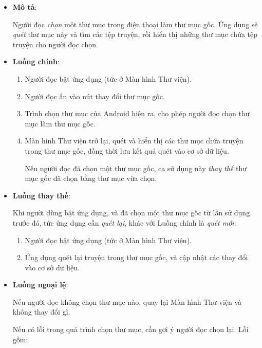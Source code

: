 \documentclass[../../thesis]{subfiles}
\begin{document}
\begin{itemize}
    \item
        \textbf{Mô tả}:

        Người đọc \emph{chọn} một thư mục trong điện thoại làm thư mục gốc. Ứng
        dụng sẽ \emph{quét} thư mục này và tìm các tệp truyện, rồi hiển thị
        những thư mục chứa tệp truyện cho người đọc chọn.
    \item
        \textbf{Luồng chính}:

        \begin{enumerate}
            \item
                Người đọc bật ứng dụng (tức ở Màn hình Thư viện).
            \item
                Người đọc ấn vào nút thay đổi thư mục gốc.
            \item
                Trình chọn thư mục của Android hiện ra, cho phép người đọc chọn
                thư mục làm thư mục gốc.
            \item
                Màn hình Thư viện trở lại, quét và hiển thị các thư mục chứa
                truyện trong thư mục gốc, đồng thời lưu kết quả quét vào cơ sở
                dữ liệu.

                Nếu người đọc đã chọn một thư mục gốc, ca sử dụng này \emph{thay
                thế} thư mục gốc đã chọn bằng thư mục vừa chọn.
        \end{enumerate}
    \item
        \textbf{Luồng thay thế}:

        Khi người dùng bật ứng dụng, và đã chọn một thư mục gốc từ lần sử dụng
        trước đó, tức ứng dụng cần \emph{quét lại}, khác với Luồng chính là
        \emph{quét mới}:

        \begin{enumerate}
            \item
                Người đọc bật ứng dụng (tức ở Màn hình Thư viện).
            \item
                Ứng dụng quét lại truyện trong thư mục gốc, và cập nhật các thay
                đổi vào cơ sở dữ liệu.
        \end{enumerate}
    \item
        \textbf{Luồng ngoại lệ}:

        Nếu người đọc không chọn thư mục nào, quay lại Màn hình Thư viện và
        không thay đổi gì.

        Nếu có lỗi trong quá trình chọn thư mục, cần gợi ý người đọc chọn lại.
        Lỗi gồm:


\end{itemize}
\end{document}

